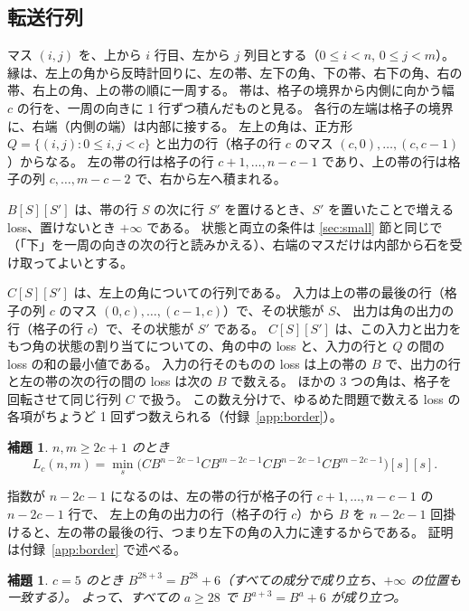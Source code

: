 \documentclass[11pt]{ltjsarticle}
\newtheorem{lemma}[theorem]{補題}
\theoremstyle{definition}
\begin{document}
\subsection{転送行列}\label{sec:transfer}

マス $(i,j)$ を、上から $i$ 行目、左から $j$ 列目とする（$0\le i<n$, $0\le j<m$）。
縁は、左上の角から反時計回りに、左の帯、左下の角、下の帯、右下の角、右の帯、右上の角、上の帯の順に一周する。
帯は、格子の境界から内側に向かう幅 $c$ の行を、一周の向きに 1 行ずつ積んだものと見る。
各行の左端は格子の境界に、右端（内側の端）は内部に接する。
左上の角は、正方形 $Q=\{(i,j): 0\le i,j<c\}$ と出力の行（格子の行 $c$ のマス $(c,0),\dots,(c,c-1)$）からなる。
左の帯の行は格子の行 $c+1,\dots,n-c-1$ であり、上の帯の行は格子の列 $c,\dots,m-c-2$ で、右から左へ積まれる。

$B[S][S']$ は、帯の行 $S$ の次に行 $S'$ を置けるとき、$S'$ を置いたことで増える loss、置けないとき $+\infty$ である。
状態と両立の条件は \ref{sec:small} 節と同じで（「下」を一周の向きの次の行と読みかえる）、右端のマスだけは内部から石を受け取ってよいとする。

$C[S][S']$ は、左上の角についての行列である。
入力は上の帯の最後の行（格子の列 $c$ のマス $(0,c),\dots,(c-1,c)$）で、その状態が $S$、
出力は角の出力の行（格子の行 $c$）で、その状態が $S'$ である。
$C[S][S']$ は、この入力と出力をもつ角の状態の割り当てについての、角の中の loss と、入力の行と $Q$ の間の loss の和の最小値である。
入力の行そのものの loss は上の帯の $B$ で、出力の行と左の帯の次の行の間の loss は次の $B$ で数える。
ほかの 3 つの角は、格子を回転させて同じ行列 $C$ で扱う。
この数え分けで、ゆるめた問題で数える loss の各項がちょうど 1 回ずつ数えられる（付録~\ref{app:border}）。

\begin{lemma}\label{lem:border-matrix}
$n,m\ge 2c+1$ のとき
\[
L_c(n,m)=\min_s\bigl(C B^{n-2c-1} C B^{m-2c-1} C B^{n-2c-1} C B^{m-2c-1}\bigr)[s][s].
\]
\end{lemma}

指数が $n-2c-1$ になるのは、左の帯の行が格子の行 $c+1,\dots,n-c-1$ の $n-2c-1$ 行で、
左上の角の出力の行（格子の行 $c$）から $B$ を $n-2c-1$ 回掛けると、左の帯の最後の行、つまり左下の角の入力に達するからである。
証明は付録~\ref{app:border} で述べる。

\begin{lemma}\label{lem:band-period}
$c=5$ のとき $B^{28+3}=B^{28}+6$（すべての成分で成り立ち、$+\infty$ の位置も一致する）。
よって、すべての $a\ge 28$ で $B^{a+3}=B^a+6$ が成り立つ。
\end{lemma}
\end{document}
